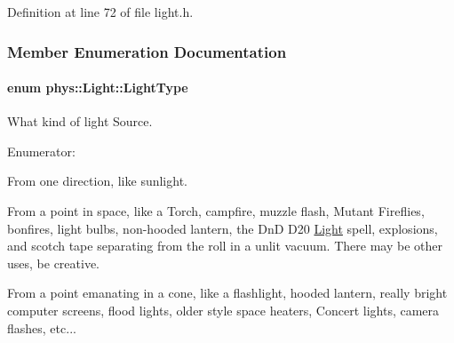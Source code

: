 Definition at line 72 of file light.h.



\subsubsection{Member Enumeration Documentation}
\hypertarget{classphys_1_1Light_aef1be63d57f59f33bf4c66be797009bf}{
\paragraph[{LightType}]{\setlength{\rightskip}{0pt plus 5cm}enum {\bf phys::Light::LightType}}\hfill}
\label{dc/df1/classphys_1_1Light_aef1be63d57f59f33bf4c66be797009bf}


What kind of light Source. 

\begin{Desc}
\item[Enumerator: ]\par
\begin{description}
\item[{\em 
\hypertarget{classphys_1_1Light_aef1be63d57f59f33bf4c66be797009bfac3ba7607dde18593ca9c727b0baf81e3}{
Directional}
\label{dc/df1/classphys_1_1Light_aef1be63d57f59f33bf4c66be797009bfac3ba7607dde18593ca9c727b0baf81e3}
}]From one direction, like sunlight. \item[{\em 
\hypertarget{classphys_1_1Light_aef1be63d57f59f33bf4c66be797009bfa8030594658d86b56e82ac4e4233eeb63}{
Point}
\label{dc/df1/classphys_1_1Light_aef1be63d57f59f33bf4c66be797009bfa8030594658d86b56e82ac4e4233eeb63}
}]From a point in space, like a Torch, campfire, muzzle flash, Mutant Fireflies, bonfires, light bulbs, non-\/hooded lantern, the DnD D20 \hyperlink{classphys_1_1Light}{Light} spell, explosions, and scotch tape separating from the roll in a unlit vacuum. There may be other uses, be creative. \item[{\em 
\hypertarget{classphys_1_1Light_aef1be63d57f59f33bf4c66be797009bfa8b7e7aa3e44d03789a35c40947e99f3a}{
Spotlight}
\label{dc/df1/classphys_1_1Light_aef1be63d57f59f33bf4c66be797009bfa8b7e7aa3e44d03789a35c40947e99f3a}
}]From a point emanating in a cone, like a flashlight, hooded lantern, really bright computer screens, flood lights, older style space heaters, Concert lights, camera flashes, etc... \end{description}
\end{Desc}



